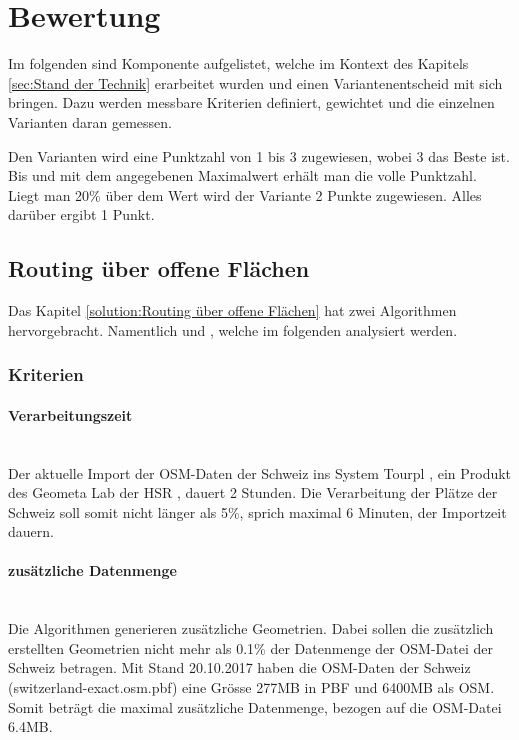 \section{Bewertung}
\label{sec:Bewertung}
Im folgenden sind Komponente aufgelistet, welche im Kontext des Kapitels \ref{sec:Stand der Technik} erarbeitet wurden und einen Variantenentscheid mit sich bringen. Dazu werden messbare Kriterien definiert, gewichtet und die einzelnen Varianten daran gemessen.

Den Varianten wird eine Punktzahl von 1 bis 3 zugewiesen, wobei 3 das Beste ist. Bis und mit dem angegebenen Maximalwert erhält man die volle Punktzahl. Liegt man 20\% über dem Wert wird der Variante 2 Punkte zugewiesen. Alles darüber ergibt 1 Punkt.

\subsection{Routing über offene Flächen}
\label{eval:Routing über offene Flächen}

Das Kapitel \ref{solution:Routing über offene Flächen} hat zwei Algorithmen hervorgebracht. Namentlich  und , welche im folgenden analysiert werden.

\subsubsection{Kriterien}
\label{sub:Kriterien}

\paragraph{Verarbeitungszeit}\label{criteria:Verarbeitungszeit}~\\
Der aktuelle Import der \ac{OSM}-Daten der Schweiz ins System Tourpl \cite{hsr_tourpl}, ein Produkt des Geometa Lab der HSR \cite{geometa_lab_hsr}, dauert 2 Stunden. Die Verarbeitung der Plätze der Schweiz soll somit nicht länger als 5\%, sprich maximal 6 Minuten, der Importzeit dauern. 


\paragraph{zusätzliche Datenmenge}\label{criteria:zusätzliche Datenmenge}~\\
Die Algorithmen generieren zusätzliche Geometrien. Dabei sollen die zusätzlich erstellten Geometrien nicht mehr als 0.1\% der Datenmenge der \ac{OSM}-Datei der Schweiz \cite{osm_data_switzerland} betragen. Mit Stand 20.10.2017 haben die \ac{OSM}-Daten der Schweiz (switzerland-exact.osm.pbf) eine Grösse 277MB in PBF und 6400MB als \ac{OSM}. Somit beträgt die maximal zusätzliche Datenmenge, bezogen auf die \ac{OSM}-Datei 6.4MB.


